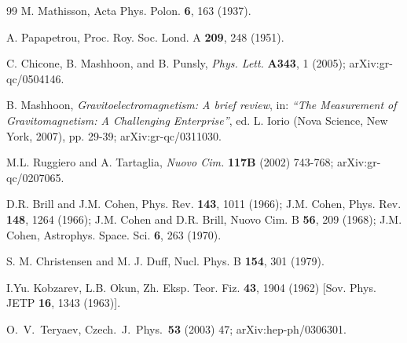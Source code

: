 \documentclass[preprint,showpacs,preprintnumbers,eqsecnum,amsmath,amssymb]{revtex4}
\begin{document}
\begin{thebibliography}{99}
M. Mathisson, %
Acta Phys. Polon. {\bf 6}, 163 (1937).

A. Papapetrou,
Proc. Roy. Soc. Lond. A {\bf 209}, 248 (1951). %

C. Chicone, B. Mashhoon, and B. Punsly,
{\sl Phys. Lett.} {\bf A343}, 1 (2005); %
arXiv:gr-qc/0504146.

B. Mashhoon, {\it Gravitoelectromagnetism: A brief review}, in:
{\sl ``The Measurement of Gravitomagnetism: A Challenging
Enterprise''}, ed. L. Iorio (Nova Science, New York, 2007), pp.
29-39; arXiv:gr-qc/0311030.

M.L. Ruggiero and A. Tartaglia, %
{\sl Nuovo Cim.} {\bf 117B} (2002) 743-768; arXiv:gr-qc/0207065.

D.R. Brill and J.M. Cohen, %
Phys. Rev. {\bf 143}, 1011 (1966); %
J.M. Cohen, %
Phys. Rev.
{\bf 148}, 1264 (1966); %
J.M. Cohen and D.R. Brill, %
Nuovo Cim. B {\bf 56}, 209 (1968); %
J.M. Cohen, %
Astrophys. Space. Sci. {\bf 6}, 263 (1970). %

S. M. Christensen and M. J. Duff,
Nucl. Phys. B \textbf{154}, 301 (1979).

I.Yu. Kobzarev, L.B. Okun,
Zh. Eksp. Teor. Fiz. {\bf 43}, 1904 (1962) [Sov. Phys. JETP {\bf
16}, 1343 (1963)].

  O.~V.~Teryaev,
  Czech.\ J.\ Phys.\ {\bf 53} (2003) 47;
  arXiv:hep-ph/0306301.

\end{thebibliography}
\end{document}
